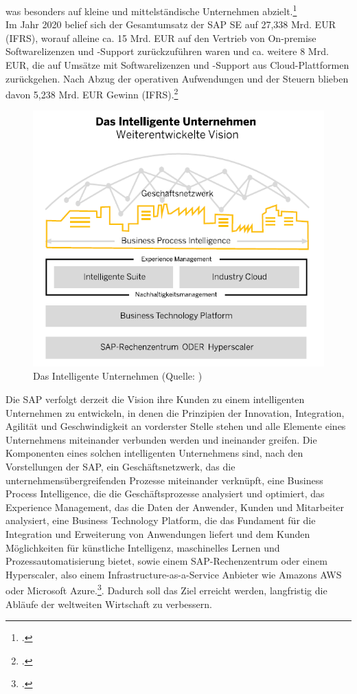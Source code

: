 was besonders auf kleine und mittelständische Unternehmen abzielt.\footcite[Vgl.][]{sap-historie}\\ Im Jahr 2020 belief sich der Gesamtumsatz der SAP SE auf 27,338 Mrd. EUR (IFRS), worauf alleine ca. 15 Mrd. EUR auf den Vertrieb von \glqq{}On-premise\grqq{} Softwarelizenzen und -Support zurückzuführen waren und ca. weitere 8 Mrd. EUR, die auf Umsätze mit Softwarelizenzen und -Support aus Cloud-Plattformen zurückgehen. Nach Abzug der operativen Aufwendungen und der Steuern blieben davon 5,238 Mrd. EUR Gewinn (IFRS).\footcite[Vgl.][S. 142]{sap2020-report} 

\begin{figure}[h!]
    \centering
    \includegraphics[scale=1]{Bilder/SAPIntelligentesUnternehmen.png}
    \caption[Das Intelligente Unternehmen]{Das Intelligente Unternehmen (Quelle: \cite[][S. 53]{sap2020-report})}
\end{figure}

Die SAP verfolgt derzeit die Vision ihre Kunden zu einem intelligenten Unternehmen zu entwickeln, in denen die Prinzipien der Innovation, Integration, Agilität und Geschwindigkeit an vorderster Stelle stehen und alle Elemente eines Unternehmens miteinander verbunden werden und ineinander greifen. Die Komponenten eines solchen intelligenten Unternehmens sind, nach den Vorstellungen der SAP, ein Geschäftsnetzwerk, das die unternehmensübergreifenden Prozesse miteinander verknüpft, eine Business Process Intelligence, die die Geschäftsprozesse analysiert und optimiert, das Experience Management, das die Daten der Anwender, Kunden und Mitarbeiter analysiert, eine Business Technology Platform, die das Fundament für die Integration und Erweiterung von Anwendungen liefert und dem Kunden Möglichkeiten für künstliche Intelligenz, maschinelles Lernen und Prozessautomatisierung bietet, sowie einem SAP-Rechenzentrum oder einem Hyperscaler, also einem Infrastructure-as-a-Service Anbieter wie Amazons AWS oder Microsoft Azure.\footcite[Vgl.][S. 53 f.]{sap2020-report}. Dadurch soll das Ziel erreicht werden, langfristig die Abläufe der weltweiten Wirtschaft zu verbessern.


